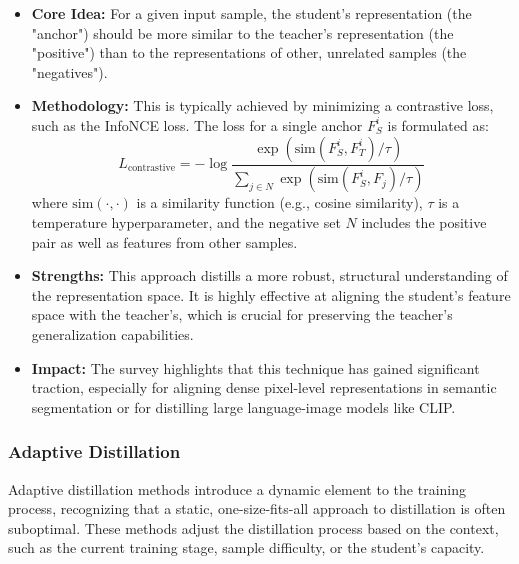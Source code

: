 \begin{itemize}
    \item \textbf{Core Idea:} For a given input sample, the student's representation (the "anchor") should be more similar to the teacher's representation (the "positive") than to the representations of other, unrelated samples (the "negatives").
    \item \textbf{Methodology:} This is typically achieved by minimizing a contrastive loss, such as the InfoNCE loss. The loss for a single anchor \(F_S^i\) is formulated as:
    \[
        L_{\text{contrastive}} = -\log \frac{\exp(\text{sim}(F_S^i, F_T^i) / \tau)}{\sum_{j \in N} \exp(\text{sim}(F_S^i, F_j) / \tau)}
    \]
    where \(\text{sim}(\cdot, \cdot)\) is a similarity function (e.g., cosine similarity), \(\tau\) is a temperature hyperparameter, and the negative set \(N\) includes the positive pair as well as features from other samples.
    \item \textbf{Strengths:} This approach distills a more robust, structural understanding of the representation space. It is highly effective at aligning the student's feature space with the teacher's, which is crucial for preserving the teacher's generalization capabilities.
    \item \textbf{Impact:} The survey highlights that this technique has gained significant traction, especially for aligning dense pixel-level representations in semantic segmentation or for distilling large language-image models like CLIP.
\end{itemize}

\subsubsection{Adaptive Distillation}
\label{ssec:adaptive_distillation}

Adaptive distillation methods introduce a dynamic element to the training process, recognizing that a static, one-size-fits-all approach to distillation is often suboptimal. These methods adjust the distillation process based on the context, such as the current training stage, sample difficulty, or the student's capacity.

